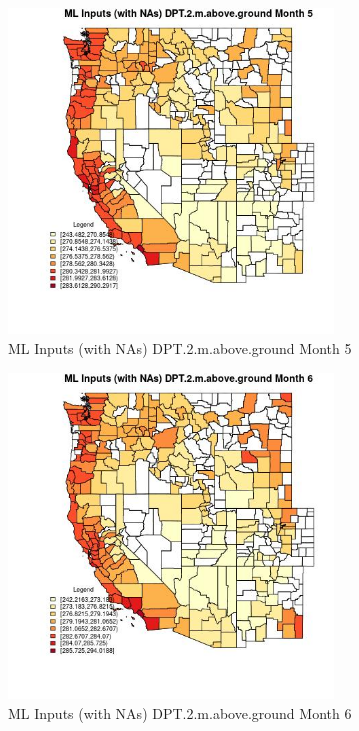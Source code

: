 \begin{figure} 
\centering  
\includegraphics[width=0.77\textwidth]{Code_Outputs/Report_ML_input_PM25_Step4_part_e_de_duplicated_aves_compiled_2019-05-21wNAs_CountyDPT2mabovegroundmedianMonth5.jpg} 
\caption{\label{fig:Report_ML_input_PM25_Step4_part_e_de_duplicated_aves_compiled_2019-05-21wNAsCountyDPT2mabovegroundmedianMonth5}ML Inputs (with NAs) DPT.2.m.above.ground Month 5} 
\end{figure} 
 

\begin{figure} 
\centering  
\includegraphics[width=0.77\textwidth]{Code_Outputs/Report_ML_input_PM25_Step4_part_e_de_duplicated_aves_compiled_2019-05-21wNAs_CountyDPT2mabovegroundmedianMonth6.jpg} 
\caption{\label{fig:Report_ML_input_PM25_Step4_part_e_de_duplicated_aves_compiled_2019-05-21wNAsCountyDPT2mabovegroundmedianMonth6}ML Inputs (with NAs) DPT.2.m.above.ground Month 6} 
\end{figure} 
 

